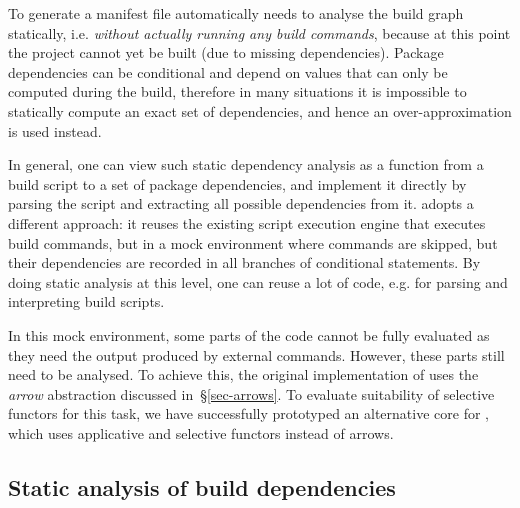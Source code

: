 

To generate a manifest file automatically \Dune needs to analyse the build graph
statically, i.e. \emph{without actually running any build commands}, because at
this point the project cannot yet be built (due to missing dependencies).
Package dependencies can be conditional and depend on values that can only be
computed during the build, therefore in many situations it is impossible to
statically compute an exact set of dependencies, and hence an over-approximation
is used instead.

In general, one can view such static dependency analysis as a function from a
build script to a set of package dependencies, and implement it directly by
parsing the script and extracting all possible dependencies from it. \Dune
adopts a different approach: it reuses the existing script execution engine that
executes build commands, but in a mock environment where commands are skipped,
but their dependencies are recorded in all branches of conditional statements.
By doing static analysis at this level, one can reuse a lot of code, e.g. for
parsing and interpreting build scripts.


In this mock environment, some parts of the code cannot be fully evaluated as
they need the output produced by external commands. However, these parts still
need to be analysed. To achieve this, the original implementation of \Dune uses
the \emph{arrow} abstraction discussed in~\S\ref{sec-arrows}. To evaluate
suitability of selective functors for this task, we have successfully prototyped
an alternative core for \Dune, which uses applicative and selective functors
instead of arrows.


\subsection{Static analysis of build dependencies}\label{sec-static-example}

